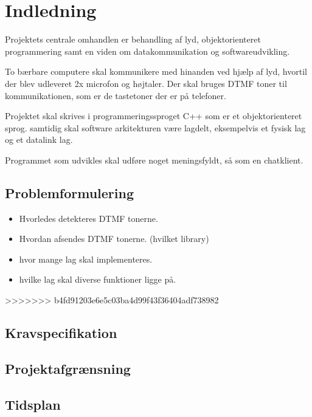 \section{Indledning}
Projektets centrale omhandlen er behandling af lyd, objektorienteret programmering samt en viden om datakommunikation og softwareudvikling.

To bærbare computere skal kommunikere med hinanden ved hjælp af lyd, hvortil der blev udleveret 2x microfon og højtaler.
Der skal bruges DTMF toner til kommunikationen, som er de tastetoner der er på telefoner.

Projektet skal skrives i programmeringssproget C++ som er et objektorienteret sprog.
samtidig skal software arkitekturen være lagdelt, eksempelvis et fysisk lag og et datalink lag.

Programmet som udvikles skal udføre noget meningsfyldt, så som en chatklient.
\subsection{Problemformulering}



\begin{itemize}
	\item Hvorledes detekteres DTMF tonerne.
	\item Hvordan afsendes DTMF tonerne. (hvilket library)
	\item hvor mange lag skal implementeres.
	\item hvilke lag skal diverse funktioner ligge på.
\end{itemize}

 

>>>>>>> b4fd91203e6e5c03ba4d99f43f36404adf738982
\subsection{Kravspecifikation}
\subsection{Projektafgrænsning}
\subsection{Tidsplan}